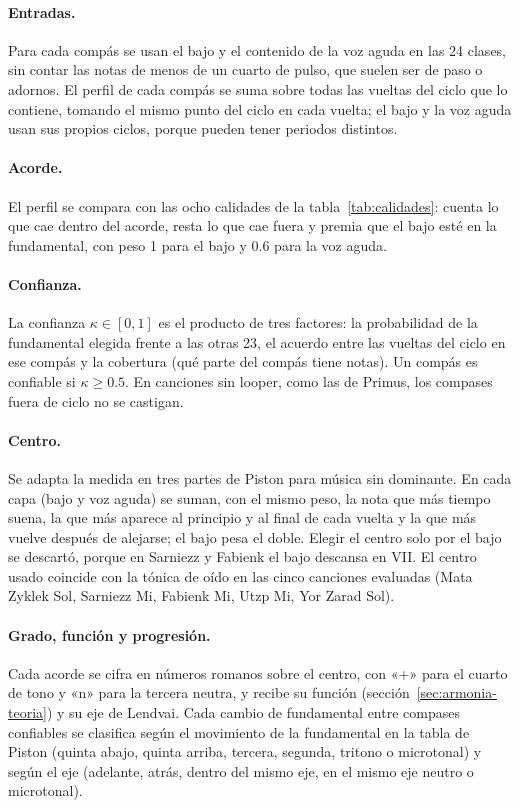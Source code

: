 \paragraph{Entradas.} Para cada compás se usan el bajo y el contenido de la voz aguda en las 24 clases, sin contar las
notas de menos de un cuarto de pulso, que suelen ser de paso o adornos. El perfil de cada compás se suma sobre todas las
vueltas del ciclo que lo contiene, tomando el mismo punto del ciclo en cada vuelta; el bajo y la voz aguda usan sus
propios ciclos, porque pueden tener periodos distintos.

\paragraph{Acorde.} El perfil se compara con las ocho calidades de la tabla~\ref{tab:calidades}: cuenta lo que cae dentro
del acorde, resta lo que cae fuera y premia que el bajo esté en la fundamental, con peso 1 para el bajo y 0.6 para la voz
aguda.

\paragraph{Confianza.} La confianza $\kappa \in [0, 1]$ es el producto de tres factores: la probabilidad de la
fundamental elegida frente a las otras 23, el acuerdo entre las vueltas del ciclo en ese compás y la cobertura (qué parte
del compás tiene notas). Un compás es confiable si $\kappa \ge 0.5$. En canciones sin looper, como las de Primus, los
compases fuera de ciclo no se castigan.

\paragraph{Centro.} Se adapta la medida en tres partes de Piston para música sin dominante. En cada capa (bajo y voz
aguda) se suman, con el mismo peso, la nota que más tiempo suena, la que más aparece al principio y al final de cada vuelta
y la que más vuelve después de alejarse; el bajo pesa el doble. Elegir el centro solo por el bajo se descartó, porque en
Sarniezz y Fabienk el bajo descansa en \fl VII. El centro usado coincide con la tónica de oído en las cinco canciones
evaluadas (Mata Zyklek Sol, Sarniezz Mi, Fabienk Mi, Utzp Mi, Yor Zarad Sol).

\paragraph{Grado, función y progresión.} Cada acorde se cifra en números romanos sobre el centro, con «+» para el cuarto
de tono y «n» para la tercera neutra, y recibe su función (sección~\ref{sec:armonia-teoria}) y su eje de Lendvai. Cada
cambio de fundamental entre compases confiables se clasifica según el movimiento de la fundamental en la tabla de Piston
(quinta abajo, quinta arriba, tercera, segunda, tritono o microtonal) y según el eje (adelante, atrás, dentro del mismo
eje, en el mismo eje neutro o microtonal).

